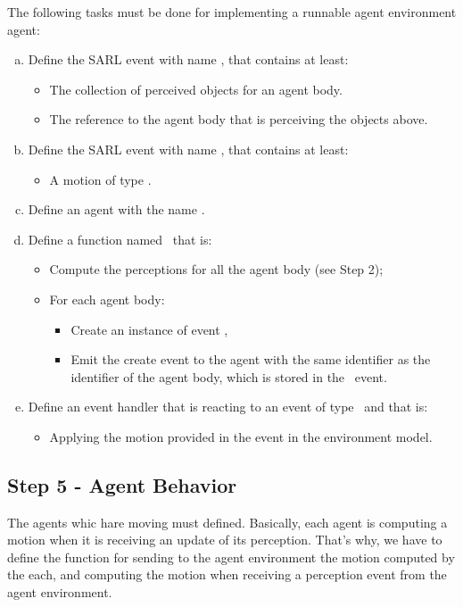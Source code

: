 \documentclass[english,nodocumentinfo,nopubpage]{utbmciadreport}
\begin{document}
The following tasks must be done for implementing a runnable agent environment agent:
\begin{enumerate}[a)]
\item Define the SARL event with name , that contains at least:
	\begin{itemize}
	\item The collection of perceived objects for an agent body.
	\item The reference to the agent body that is perceiving the objects above.
	\end{itemize}
\item Define the SARL event with name , that contains at least:
	\begin{itemize}
	\item A motion of type .
	\end{itemize}
\item Define an agent with the name .
\item Define a function named \ that is:
	\begin{itemize}
	\item Compute the perceptions for all the agent body (see Step 2);
	\item For each agent body:
		\begin{itemize}
		\item Create an instance of event ,
		\item Emit the create event to the agent with the same identifier as the identifier of the agent body, which is stored in the \ event.
		\end{itemize}
	\end{itemize}
\item Define an event handler that is reacting to an event of type \ and that is:
	\begin{itemize}
	\item Applying the motion provided in the event in the environment model.
	\end{itemize}
\end{enumerate}


\subsection{Step 5 - Agent Behavior}

The agents whic hare moving must defined. Basically, each agent is computing a motion when it is receiving an update of its perception. That's why, we have to define the function for sending to the agent environment the motion computed by the each, and computing the motion when receiving a perception event from the agent environment.
\end{document}
